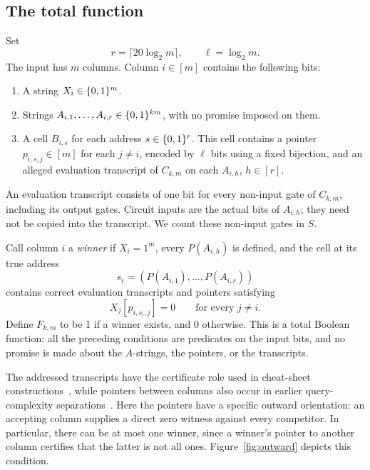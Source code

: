 \subsection{The total function}

Set
\begin{equation}\label{eq:r-def}
 r=\lceil20\log_2m\rceil,
 \qquad \ell=\log_2m.
\end{equation}
The input has $m$ columns.  Column $i\in[m]$ contains the following bits:
\begin{enumerate}
 \item A string $X_i\in\{0,1\}^m$.
 \item Strings $A_{i,1},\ldots,A_{i,r}\in\{0,1\}^{km}$, with no promise
 imposed on them.
 \item A cell $B_{i,s}$ for each address $s\in\{0,1\}^r$.  This cell
 contains a pointer $p_{i,s,j}\in[m]$ for each $j\ne i$, encoded by
 $\ell$ bits using a fixed bijection, and an alleged evaluation transcript
 of $C_{k,m}$ on each $A_{i,h}$, $h\in[r]$.
\end{enumerate}
An evaluation transcript consists of one bit for every non-input gate of
$C_{k,m}$, including its output gates.  Circuit inputs are the actual bits
of $A_{i,h}$; they need not be copied into the transcript.  We count these
non-input gates in $S$.

Call column $i$ a \emph{winner} if $X_i=1^m$, every $P(A_{i,h})$ is
defined, and the cell at its true address
\begin{equation}\label{eq:true-address}
 s_i=(P(A_{i,1}),\ldots,P(A_{i,r}))
\end{equation}
contains correct evaluation transcripts and pointers satisfying
\begin{equation}\label{eq:outward-pointers}
 X_j[p_{i,s_i,j}]=0\qquad\text{for every }j\ne i.
\end{equation}
Define $F_{k,m}$ to be 1 if a winner exists, and 0 otherwise.  This is a
total Boolean function: all the preceding conditions are predicates on
the input bits, and no promise is made about the $A$-strings, the pointers,
or the transcripts.

The addressed transcripts have the certificate role used in cheat-sheet
constructions~\cite{ABK16}, while pointers between columns also occur in
earlier query-complexity separations~\cite{GPW15,ABBLSS17}. Here the pointers have
a specific outward orientation: an accepting column supplies a direct
zero witness against every competitor.  In particular, there can be at
most one winner, since a winner's pointer to another column certifies that
the latter is not all ones.  Figure~\ref{fig:outward} depicts this
condition.

